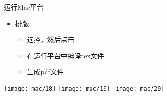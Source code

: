 \documentclass[fontset = none, t]{ctexbeamer}
\begin{document}
\begin{frame}{运行\tl}{Mac平台}
  \begin{spacing}{1.5}
    \begin{itemize}
    \item 排版
        \begin{itemize}
        \item 选择，然后点击
        \item 在运行平台中编译tex文件
        \item 生成pdf文件
        \end{itemize}
    \end{itemize}
    \begin{center}
      \texttt{[image: mac/18]}
      \texttt{[image: mac/19]}
      \texttt{[image: mac/20]}
    \end{center}
  \end{spacing}         
\end{frame}
\end{document}
